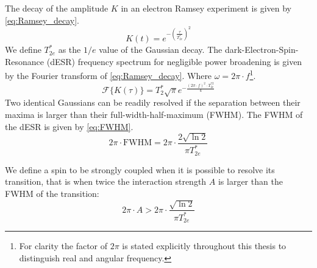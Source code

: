 The decay of the amplitude $K$ in an electron Ramsey experiment is given by \cref{eq:Ramsey_decay}.
\begin{equation}
    K(t) = e^{-(\tfrac{\tau}{T_{2e}^*})^2}
    \label{eq:Ramsey_decay}
\end{equation}
We define $T_{2e}^*$ as the $1/e$ value of the Gaussian decay. The dark-Electron-Spin-Resonance (dESR) frequency spectrum for negligible power broadening is given by the Fourier transform of \cref{eq:Ramsey_decay}. Where $\omega = 2\pi \cdot f$\footnote{For clarity the factor of $2\pi$ is stated explicitly throughout this thesis to distinguish real and angular frequency. }.
\begin{equation}
    \mathcal{F} \{ K(\tau) \} =  T_2^* \sqrt{\pi} e^{-\tfrac{(2\pi \cdot f) ^2 \cdot T_{2e}^{*2}}{ 4}}
\end{equation}
Two identical Gaussians can be readily resolved if the separation between their maxima is larger than their full-width-half-maximum (FWHM).
The FWHM of the dESR is given by \cref{eq:FWHM}.
\begin{equation}
    2\pi \cdot \mathrm{FWHM} = 2\pi \cdot \frac{2\sqrt{\ln{2}}}{\pi T_{2e}^*}
    \label{eq:FWHM}
\end{equation}

We define a spin to be strongly coupled when it is possible to resolve its transition, that is when twice the interaction strength $A$ is larger than the FWHM of the transition:
\begin{equation}
     2\pi \cdot A> 2\pi \cdot \frac{\sqrt{\ln{2}}}{\pi T_{2e}^*}
     \label{eq:def_strongly_coupled}
 \end{equation}

